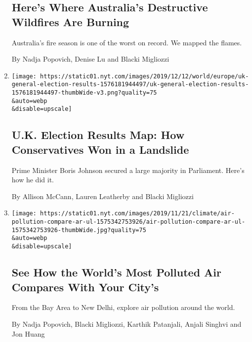 \begin{enumerate}
  \hypertarget{heres-where-australias-destructive-wildfires-are-burning}{%
  \subsection{Here's Where Australia's Destructive Wildfires Are
  Burning}\label{heres-where-australias-destructive-wildfires-are-burning}}

  Australia's fire season is one of the worst on record. We mapped the
  flames.

  By Nadja Popovich, Denise Lu and Blacki Migliozzi
\item
  \href{/interactive/2019/12/13/world/europe/uk-general-election-results.html}{}

  \texttt{[image: https://static01.nyt.com/images/2019/12/12/world/europe/uk-general-election-results-1576181944497/uk-general-election-results-1576181944497-thumbWide-v3.png?quality=75\\\&auto=webp\\\&disable=upscale]}

  \hypertarget{uk-election-results-map-how-conservatives-won-in-a-landslide}{%
  \subsection{U.K. Election Results Map: How Conservatives Won in a
  Landslide}\label{uk-election-results-map-how-conservatives-won-in-a-landslide}}

  Prime Minister Boris Johnson secured a large majority in Parliament.
  Here's how he did it.

  By Allison McCann, Lauren Leatherby and Blacki Migliozzi
\item
  \href{/interactive/2019/12/02/climate/air-pollution-compare-ar-ul.html}{}

  \texttt{[image: https://static01.nyt.com/images/2019/11/21/climate/air-pollution-compare-ar-ul-1575342753926/air-pollution-compare-ar-ul-1575342753926-thumbWide.jpg?quality=75\\\&auto=webp\\\&disable=upscale]}

  \hypertarget{see-how-the-worlds-most-polluted-air-compares-with-your-citys}{%
  \subsection{See How the World's Most Polluted Air Compares With Your
  City's}\label{see-how-the-worlds-most-polluted-air-compares-with-your-citys}}

  From the Bay Area to New Delhi, explore air pollution around the
  world.

  By Nadja Popovich, Blacki Migliozzi, Karthik Patanjali, Anjali Singhvi
  and Jon Huang
\end{enumerate}

